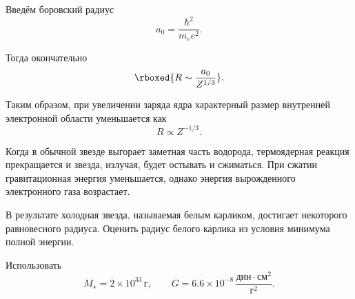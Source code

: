 \documentclass[../final.tex]{subfiles}
\begin{document}
Введём боровский радиус
%
\begin{equation*}
    a_0
    =
    \frac{\hbar^2}{m_ee^2}.
\end{equation*}

Тогда окончательно
%
\begin{equation*}
    \rboxed{
        R
        \sim
        \frac{a_0}{Z^{1/3}}
    }.
\end{equation*}

Таким образом, при увеличении заряда ядра характерный размер
внутренней электронной области уменьшается как
%
\begin{equation*}
    R
    \propto
    Z^{-1/3}.
\end{equation*}



\newpage
{}

\condition
Когда в обычной звезде выгорает заметная часть водорода,
термоядерная реакция прекращается и звезда, излучая, будет остывать
и сжиматься. При сжатии гравитационная энергия уменьшается,
однако энергия вырожденного электронного газа возрастает.

В результате холодная звезда, называемая белым карликом,
достигает некоторого равновесного радиуса.
Оценить радиус белого карлика из условия минимума полной энергии.

Использовать
%
\begin{equation*}
    M_\star
    =
    2\times10^{33}\,\text{г},
    \qquad
    G
    =
    6.6\times10^{-8}\,
    \frac{\text{дин}\cdot\text{см}^2}{\text{г}^2}.
\end{equation*}


\end{document}
